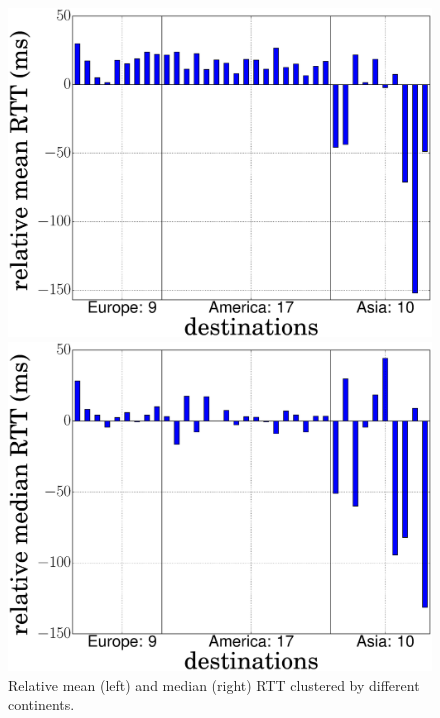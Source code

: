 \begin{figure}[!t]
	\begin{minipage}[c]{.49\linewidth}
		\begin{center}
			\includegraphics[width=.9\linewidth]{Pics/2015/4_probes_to_alexa_top50_diff_rtt_LISP-Lab_FranceIX_mean_geo.eps}
		\end{center}
	\end{minipage}
	\begin{minipage}[c]{.49\linewidth}
		\begin{center}
			\includegraphics[width=.9\linewidth]{Pics/2015/4_probes_to_alexa_top50_diff_rtt_LISP-Lab_FranceIX_median_geo.eps}
		\end{center}
	\end{minipage}
	\vspace{-0.5mm}
	\caption{Relative mean (left) and median (right) RTT clustered by different continents.}
	\label{4_probes_to_alexa_top50_diff_rtt_LISP-Lab_FranceIX_geo}
\end{figure}
	
